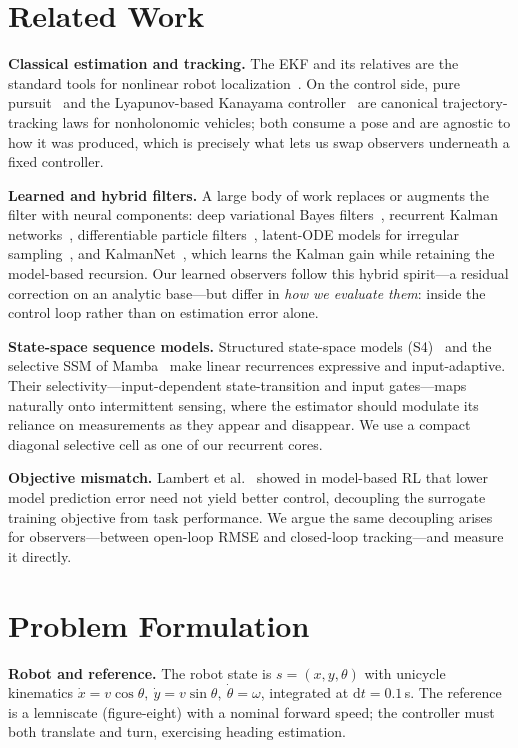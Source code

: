 \documentclass[10pt]{article}
\begin{document}
\section{Related Work}
\textbf{Classical estimation and tracking.} The EKF and its relatives are the standard tools for
nonlinear robot localization~\cite{thrun,siegwart}. On the control side, pure
pursuit~\cite{coulter} and the Lyapunov-based Kanayama controller~\cite{kanayama} are canonical
trajectory-tracking laws for nonholonomic vehicles; both consume a pose and are agnostic to how it
was produced, which is precisely what lets us swap observers underneath a fixed controller.

\textbf{Learned and hybrid filters.} A large body of work replaces or augments the filter with
neural components: deep variational Bayes filters~\cite{dvbf}, recurrent Kalman
networks~\cite{rkn}, differentiable particle filters~\cite{dpf}, latent-ODE
models for irregular sampling~\cite{latentode}, and KalmanNet~\cite{kalmannet}, which learns the
Kalman gain while retaining the model-based recursion. Our learned observers follow this hybrid
spirit---a residual correction on an analytic base---but differ in \emph{how we evaluate them}:
inside the control loop rather than on estimation error alone.

\textbf{State-space sequence models.} Structured state-space models (S4)~\cite{s4} and the
selective SSM of Mamba~\cite{mamba} make linear recurrences expressive and input-adaptive. Their
selectivity---input-dependent state-transition and input gates---maps naturally onto intermittent
sensing, where the estimator should modulate its reliance on measurements as they appear and
disappear. We use a compact diagonal selective cell as one of our recurrent cores.

\textbf{Objective mismatch.} Lambert et al.~\cite{lambert} showed in model-based RL that lower
model prediction error need not yield better control, decoupling the surrogate training objective
from task performance. We argue the same decoupling arises for observers---between open-loop RMSE
and closed-loop tracking---and measure it directly.

\section{Problem Formulation}
\textbf{Robot and reference.} The robot state is $s=(x,y,\theta)$ with unicycle kinematics
$\dot{x}=v\cos\theta,\ \dot{y}=v\sin\theta,\ \dot\theta=\omega$, integrated at $\mathrm{d}t=0.1$\,s.
The reference is a lemniscate (figure-eight) with a nominal forward speed; the controller must both
translate and turn, exercising heading estimation.
\end{document}
